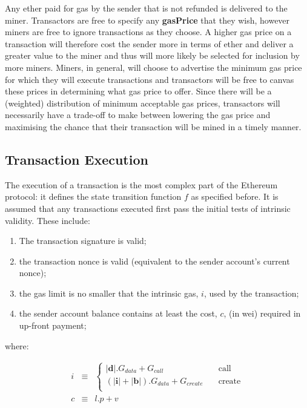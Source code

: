 \documentclass[9pt,oneside]{amsart}
\begin{document}
\begin{multicols}{2}
Any ether paid for gas by the sender that is not refunded is delivered to the miner. Transactors are free to specify any \textbf{gasPrice} that they wish, however miners are free to ignore transactions as they choose. A higher gas price on a transaction will therefore cost the sender more in terms of ether and deliver a greater value to the miner and thus will more likely be selected for inclusion by more miners. Miners, in general, will choose to advertise the minimum gas price for which they will execute transactions and transactors will be free to canvas these prices in determining what gas price to offer. Since there will be a (weighted) distribution of minimum acceptable gas prices, transactors will necessarily have a trade-off to make between lowering the gas price and maximising the chance that their transaction will be mined in a timely manner.


\subsection{Transaction Execution} \label{ch:execution}

The execution of a transaction is the most complex part of the Ethereum protocol: it defines the state transition function $f$ as specified before. It is assumed that any transactions executed first pass the initial tests of intrinsic validity. These include:

\begin{enumerate}
\item The transaction signature is valid;
\item the transaction nonce is valid (equivalent to the sender account's current nonce);
\item the gas limit is no smaller that the intrinsic gas, $i$, used by the transaction;
\item the sender account balance contains at least the cost, $c$, (in wei) required in up-front payment;
\end{enumerate}

where:

\begin{eqnarray}
i & \equiv & \begin{cases}
  |\mathbf{d}|.G_{data} + G_{call} & \quad \text{call} \\
  (|\mathbf{i}| + |\mathbf{b}|).G_{data} + G_{create} & \quad \text{create} \\
\end{cases} \\
c & \equiv & l.p + v
\end{eqnarray}


\end{multicols}
\end{document}
